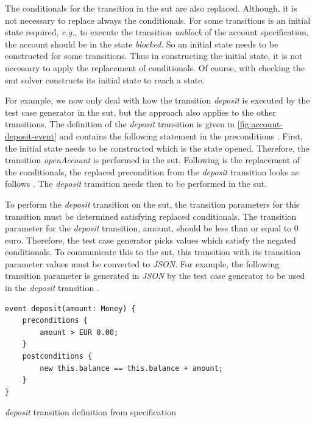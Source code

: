 The conditionals for the transition in the \gls{sut} are also replaced.
Although, it is not necessary to replace always the conditionals. For some
transitions is an initial state required, \textit{e.g.}, to execute the
transition \textit{unblock} of the account specification, the account should be
in the state \textit{blocked}. So an initial state needs to be constructed for
some transitions.
Thus in constructing the initial state, it is not necessary to apply the
replacement of conditionals. Of course, with checking the \gls{smt} solver
constructs its initial state to reach a state.


For example, we now only deal with how the transition \textit{deposit} is
executed by the test case generator in the \gls{sut}, but the approach also
applies to the other transitions.
The definition of the \textit{deposit} transition is given in
\autoref{fig:account-deposit-event} and contains the following statement in the
preconditions . First, the initial state needs to be
constructed which is the state opened. Therefore, the transition \textit{openAccount} is performed in the \gls{sut}.
Following is the replacement of the conditionals, the
replaced precondition from the \textit{deposit} transition looks as follows
. The \textit{deposit} transition needs then to be
performed in the \gls{sut}.

To perform the \textit{deposit} transition on the \gls{sut}, the transition
parameters for this transition must be determined satisfying replaced
conditionals. The transition parameter for the \textit{deposit} transition,
amount, should be less than or equal to 0 euro. Therefore, the test case
generator picks values which satisfy the negated conditionals.
To communicate this to the \gls{sut}, this transition with its transition
parameter values must be converted to \textit{JSON}.
For example, the following transition parameter is generated in \textit{JSON} by
the test case generator to be used in the \textit{deposit} transition
.

\begin{sourcecode}[h!]
\begin{lstlisting}[]
event deposit(amount: Money) {
	preconditions {
		amount > EUR 0.00;
	}
	postconditions {
		new this.balance == this.balance + amount;
	}
}
\end{lstlisting}
\caption{\textit{deposit} transition definition from specification}\label{fig:account-deposit-event}
\end{sourcecode}
\FloatBarrier

